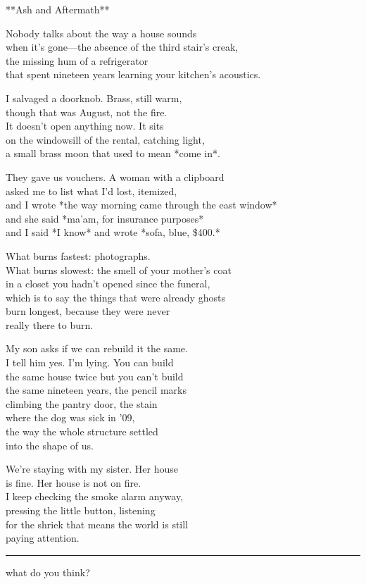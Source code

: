 \documentclass[
  10pt,
]{article}
\renewenvironment{quote}{\begin{leftbar}\small}{\end{leftbar}}
\begin{document}
\begin{quote}
**Ash and Aftermath**

Nobody talks about the way a house sounds\\
when it's gone---the absence of the third stair's creak,\\
the missing hum of a refrigerator\\
that spent nineteen years learning your kitchen's acoustics.

I salvaged a doorknob. Brass, still warm,\\
though that was August, not the fire.\\
It doesn't open anything now. It sits\\
on the windowsill of the rental, catching light,\\
a small brass moon that used to mean *come in*.

They gave us vouchers. A woman with a clipboard\\
asked me to list what I'd lost, itemized,\\
and I wrote *the way morning came through the east window*\\
and she said *ma'am, for insurance purposes*\\
and I said *I know* and wrote *sofa, blue, \$400.*

What burns fastest: photographs.\\
What burns slowest: the smell of your mother's coat\\
in a closet you hadn't opened since the funeral,\\
which is to say the things that were already ghosts\\
burn longest, because they were never\\
really there to burn.

My son asks if we can rebuild it the same.\\
I tell him yes. I'm lying. You can build\\
the same house twice but you can't build\\
the same nineteen years, the pencil marks\\
climbing the pantry door, the stain\\
where the dog was sick in '09,\\
the way the whole structure settled\\
into the shape of us.

We're staying with my sister. Her house\\
is fine. Her house is not on fire.\\
I keep checking the smoke alarm anyway,\\
pressing the little button, listening\\
for the shriek that means the world is still\\
paying attention.

\begin{center}\rule{0.5\linewidth}{0.5pt}\end{center}

what do you think?
\end{quote}
\end{document}
